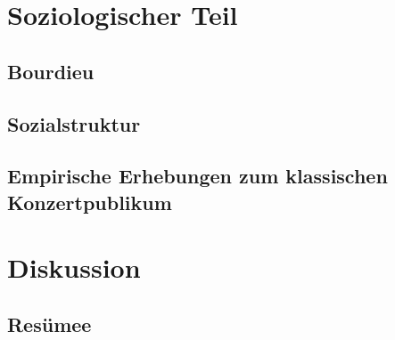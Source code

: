 \documentclass[a4paper, german, oneside]{scrbook}
\begin{document}

\part{Soziologischer Teil}
\chapter{Bourdieu}

\chapter{Sozialstruktur}

\chapter{Empirische Erhebungen zum klassischen Konzertpublikum}

\part{Diskussion}
\chapter{Resümee}




\printbibliography
\end{document}
